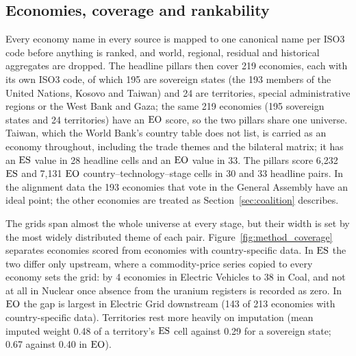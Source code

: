 \subsection{Economies, coverage and rankability}\label{subsec:data_countries}

Every economy name in every source is mapped to one canonical name per ISO3 code before anything
is ranked, and world, regional, residual and historical aggregates are dropped. The headline
pillars then cover 219 economies, each with its own ISO3 code, of which 195 are sovereign states
(the 193 members of the United Nations, Kosovo and Taiwan) and 24 are territories, special
administrative regions or the West Bank and Gaza; the same 219 economies (195 sovereign states and
24 territories) have an $\mathrm{EO}$ score, so the two pillars share one universe. Taiwan, which the
World Bank's country table does not list, is carried as an economy throughout, including the trade
themes and the bilateral matrix; it has an $\mathrm{ES}$ value in 28 headline cells and an $\mathrm{EO}$ value in
33. The pillars score 6,232 $\mathrm{ES}$ and 7,131 $\mathrm{EO}$ country--technology--stage cells in 30 and 33
headline pairs. In the alignment data the 193 economies that vote in the General Assembly have an
ideal point; the other economies are treated as Section~\ref{sec:coalition} describes.

The grids span almost the whole universe at every stage, but their width is set by the most
widely distributed theme of each pair. Figure~\ref{fig:method_coverage} separates economies scored
from economies with country-specific data. In $\mathrm{ES}$ the two differ only upstream, where a
commodity-price series copied to every economy sets the grid: by 4 economies in Electric Vehicles
to 38 in Coal, and not at all in Nuclear once absence from the uranium registers is recorded as
zero. In $\mathrm{EO}$ the gap is largest in Electric Grid downstream (143 of 213 economies with
country-specific data). Territories rest more heavily on imputation (mean imputed weight 0.48 of a
territory's $\mathrm{ES}$ cell against 0.29 for a sovereign state; 0.67 against 0.40 in $\mathrm{EO}$).

